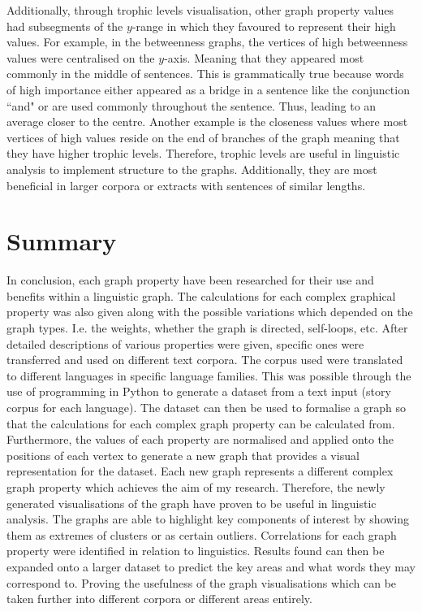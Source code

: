 Additionally, through trophic levels visualisation, other graph property values had subsegments of the $y$-range in which they favoured to represent their high values. For example, in the betweenness graphs, the vertices of high betweenness values were centralised on the $y$-axis. Meaning that they appeared most commonly in the middle of sentences. This is grammatically true because words of high importance either appeared as a bridge in a sentence like the conjunction ``and" or are used commonly throughout the sentence. Thus, leading to an average closer to the centre. Another example is the closeness values where most vertices of high values reside on the end of branches of the graph meaning that they have higher trophic levels. Therefore, trophic levels are useful in linguistic analysis to implement structure to the graphs. Additionally, they are most beneficial in larger corpora or extracts with sentences of similar lengths.

\section{Summary}
In conclusion, each graph property have been researched for their use and benefits within a linguistic graph. The calculations for each complex graphical property was also given along with the possible variations which depended on the graph types. I.e. the weights, whether the graph is directed, self-loops, etc. After detailed descriptions of various properties were given, specific ones were transferred and used on different text corpora. The corpus used were translated to different languages in specific language families. This was possible through the use of programming in Python to generate a dataset from a text input (story corpus for each language). The dataset can then be used to formalise a graph so that the calculations for each complex graph property can be calculated from. Furthermore, the values of each property are normalised and applied onto the positions of each vertex to generate a new graph that provides a visual representation for the dataset. Each new graph represents a different complex graph property which achieves the aim of my research. Therefore, the newly generated visualisations of the graph have proven to be useful in linguistic analysis. The graphs are able to highlight key components of interest by showing them as extremes of clusters or as certain outliers. Correlations for each graph property were identified in relation to linguistics. Results found can then be expanded onto a larger dataset to predict the key areas and what words they may correspond to. Proving the usefulness of the graph visualisations which can be taken further into different corpora or different areas entirely.

